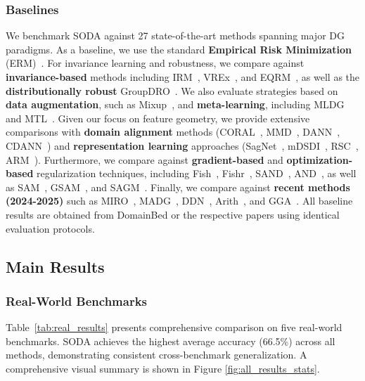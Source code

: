 \subsubsection{Baselines}
\begin{sloppypar} 
We benchmark SODA against 27 state-of-the-art methods spanning major DG paradigms. As a baseline, we use the standard \textbf{Empirical Risk Minimization} (ERM)~\citep{vapnik1999nature}. For invariance learning and robustness, we compare against \textbf{invariance-based} methods including IRM~\citep{arjovsky2019invariant}, VREx~\citep{krueger2021out}, and EQRM~\citep{eastwood2022probable}, as well as the \textbf{distributionally robust} GroupDRO~\citep{sagawa2019distributionally}. We also evaluate strategies based on \textbf{data augmentation}, such as Mixup~\citep{zhang2018mixup}, and \textbf{meta-learning}, including MLDG~\citep{li2018learning_meta} and MTL~\citep{blanchard2021domain}. Given our focus on feature geometry, we provide extensive comparisons with \textbf{domain alignment} methods (CORAL~\citep{sun2016deep}, MMD~\citep{li2018domain_mmd}, DANN~\citep{ganin2016domain}, CDANN~\citep{li2018deep_cdann}) and \textbf{representation learning} approaches (SagNet~\citep{nam2021reducing}, mDSDI~\citep{bui2021exploiting}, RSC~\citep{huang2020self}, ARM~\citep{zhang2021adaptive}). Furthermore, we compare against \textbf{gradient-based} and \textbf{optimization-based} regularization techniques, including Fish~\citep{shi2022gradient}, Fishr~\citep{rame2022fishr}, SAND~\citep{shahtalebi2021sandmask}, AND~\citep{park2021andmask}, as well as SAM~\citep{foret2021sharpness}, GSAM~\citep{zhuang2022surrogate}, and SAGM~\citep{wang2023sharpness}. Finally, we compare against \textbf{recent methods (2024-2025)} such as MIRO~\citep{cha2022domain}, MADG~\citep{madg2023}, DDN~\citep{zhang2023aggregation}, Arith~\citep{Wang2025BalancedDF}, and GGA~\citep{gga2025}. All baseline results are obtained from DomainBed or the respective papers using identical evaluation protocols.
\end{sloppypar} 
\subsection{Main Results}
\label{ssec:main_results}

\subsubsection{Real-World Benchmarks}

Table~\ref{tab:real_results} presents comprehensive comparison on five real-world benchmarks. SODA achieves the highest average accuracy (66.5\%) across all methods, demonstrating consistent cross-benchmark generalization. A comprehensive visual summary is shown in Figure \ref{fig:all_results_stats}.

